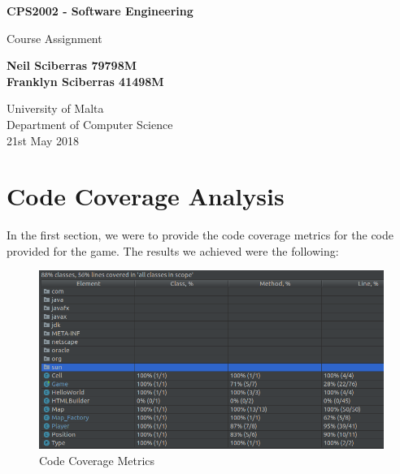 \documentclass{article}
\begin{document}
\begin{titlepage}
    \begin{center}
        \vspace*{1cm}
        
        \Huge
        \textbf{CPS2002 - Software Engineering}
        
        \vspace{0.5cm} 
        \LARGE
        Course Assignment
        
        \vspace{1.5cm}
        
        \textbf{Neil Sciberras 79798M}\\
        \textbf{Franklyn Sciberras 41498M}
        
        \vfill
        
        
        \Large
        University of Malta\\
        Department of Computer Science\\
        21st May 2018
        
    \end{center}
\end{titlepage}

\tableofcontents
\newpage

\section{Code Coverage Analysis}
In the first section, we were to provide the code coverage metrics for the code provided for the game. The results we achieved were the following:
    
    \begin{figure}[h]
        \centering
        \includegraphics[width=\linewidth]{./Images/code_coverage_metrics.png}
        \caption{Code Coverage Metrics}
    \end{figure}
\end{document}
